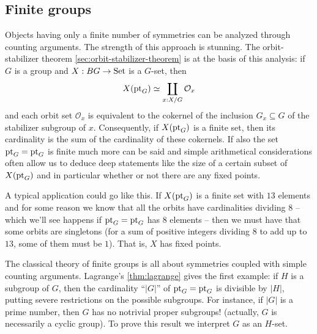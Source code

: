 
\subsection{Finite groups}
\label{sec:fingp}
\newcommand{\gporder}{cardinality\xspace}
\newcommand{\gporders}{cardinalities\xspace}
Objects having only a finite number of symmetries can be analyzed through counting arguments.  The strength of this approach is stunning.  The orbit-stabilizer theorem \cref{sec:orbit-stabilizer-theorem} is at the basis of this analysis: if $G$ is a group and $X:BG\to\mathord{\mathrm{Set}}$ is a $G$-set, then
$$X({\mathord{\mathrm{pt}}}_G)\simeq \coprod_{x:X/G}\mathcal O_x$$
and each orbit set $\mathcal O_x$ is equivalent to the cokernel of the inclusion $G_x\subseteq G$ of the stabilizer subgroup of $x$.
Consequently, if $X({\mathord{\mathrm{pt}}}_G)$ is a finite set, then its cardinality is the sum of the cardinality of these cokernels.  If also the set ${\mathord{\mathrm{pt}}}_G={\mathord{\mathrm{pt}}}_G$ is finite much more can be said and simple arithmetical considerations often allow us to deduce deep statements like the size of a certain subset of $X({\mathord{\mathrm{pt}}}_G)$ and in particular whether or not there are any fixed points.

\begin{example}
  A typical application could go like this.  
If $X({\mathord{\mathrm{pt}}}_G)$ is a finite set with $13$ elements and for some reason we know that all the orbits have cardinalities dividing $8$ -- which we'll see happens if ${\mathord{\mathrm{pt}}}_G={\mathord{\mathrm{pt}}}_G$ has $8$ elements -- then we must have that some orbits are singletons (for a sum of positive integers dividing $8$ to add up to $13$, some of them must be $1$).
That is, $X$ has fixed points.
\end{example}

The classical theory of finite groups is all about symmetries coupled with simple counting arguments. 
Lagrange's \cref{thm:lagrange} gives the first example: if $H$ is a subgroup of $G$, then the cardinality ``$|G|$'' of ${\mathord{\mathrm{pt}}}_G={\mathord{\mathrm{pt}}}_G$ is divisible by $|H|$, putting severe restrictions on the possible subgroups.  For instance, if $|G|$ is a prime number, then $G$ has no notrivial proper subgroups! (actually, $G$ is necessarily a cyclic group).  To prove this result we interpret $G$ as an $H$-set.


